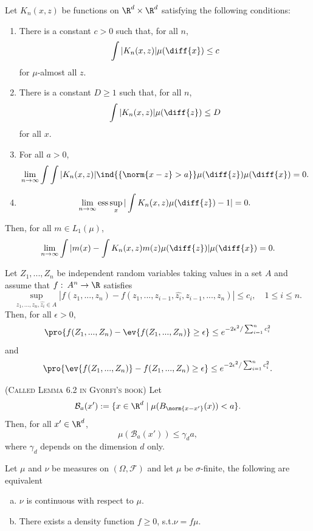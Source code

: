 \begin{theorem} \label{banachsteinhaus} %
 Let $K_n(x,z)$ be functions on $\R^d \times \R^d$ satisfying the following conditions:
\begin{enumerate} [label=(\roman*)]
    \item There is a constant $c>0$ such that, for all $n$,
        \[\int |K_n(x,z)| \mu(\diff{x}) \leq c\]
        for $\mu$-almost all $z$.
    \item There is a constant $D \geq 1$ such that, for all $n$,
        \[\int |K_n(x,z)| \mu(\diff{z}) \leq D\]
        for all $x$.
    \item For all $a>0$,
        \[ \lim\limits_{n \rightarrow \infty} \int \int |K_n(x,z)| \ind{\{ \norm{x-z} > a\}} \mu(\diff{z}) \mu(\diff{x}) = 0. \]
    \item \[ \lim\limits_{n \rightarrow \infty} \text{ess}\sup\limits_{x} | \int K_n(x,z) \mu(\diff{z})     -1 | = 0.\]
\end{enumerate}
Then, for all $m \in L_1(\mu)$,
\[\lim\limits_{n \rightarrow \infty} \int | m(x) - \int K_n(x,z)m(z) \mu(\diff{z}) | \mu(\diff{x}) = 0.\] 
\end{theorem}

\begin{theorem} \label{mcdiarmidineq}
    Let $Z_1,...,Z_n$ be independent random variables taking values in a set $A$ and assume that $f:\: A^n \rightarrow \R$ satisfies
    \[
        \sup\limits_{z_1,...,z_n,\hat{z_i} \in A} |f(z_1,...,z_n) - f(z_1,...,z_{i-1},\hat{z_i}, z_{i-1},...,z_n)| \leq c_i, \quad 1 \leq i \leq n.
    \]
    Then, for all $\epsilon > 0$,
    \[
        \pro{f(Z_1,...,Z_n) - \ev{f(Z_1,...,Z_n)} \geq \epsilon} \leq e^{-2\epsilon^2/\sum_{i=1}^n c_i^2}
    \]
    and
    \[
        \pro{\ev{f(Z_1,...,Z_n)} - f(Z_1,...,Z_n) \geq \epsilon} \leq e^{-2\epsilon^2/\sum_{i=1}^n c_i^2}.
    \]
\end{theorem}

\begin{lemma}  \label{lemma6.2}
    \textsc{(Called Lemma 6.2 in Györfi's book)}
    Let
    \[
        \mathcal{B}_a(x') := \{x \in \R^d \mid \mu(B_{\norm{x - x'}}(x)) < a\}.
    \]
    Then, for all \(x' \in \R^d\),
    \[
        \mu(\mathcal{B}_a(x')) \leq \gamma_d a,
    \]
    where \(\gamma_d\) depends on the dimension \(d\) only.
\end{lemma}

\begin{theorem} \label{radonnikodym}
Let \(\mu\) and \(\nu\) be measures on \((\Omega, \mathcal{F})\) and let \(\mu\) be \(\sigma\)-finite, the following are equivalent
\begin{enumerate}[a)]
    \item \(\nu\) is continuous with respect to \(\mu\).
    \item There exists a density function \(f \geq 0\), s.t.\@ \(\nu = f\mu\).
\end{enumerate}
\end{theorem}

